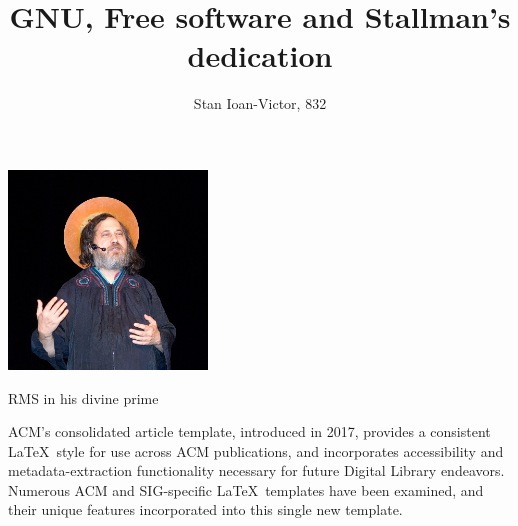 \documentclass[sigplan,screen]{acmart}
\begin{document}
\title{GNU, Free software and Stallman's dedication}

\author{Stan Ioan-Victor, 832}

\begin{teaserfigure}
	\includegraphics[width=200px]{pics/jesus-stallman.jpg}
	\centering
	\caption{RMS in his divine prime}
	\label{fig:teaser}
\end{teaserfigure}

\maketitle

ACM's consolidated article template, introduced in 2017, provides a
consistent \LaTeX\ style for use across ACM publications, and
incorporates accessibility and metadata-extraction functionality
necessary for future Digital Library endeavors. Numerous ACM and
SIG-specific \LaTeX\ templates have been examined, and their unique
features incorporated into this single new template.

\nocite{*}




\end{document}
